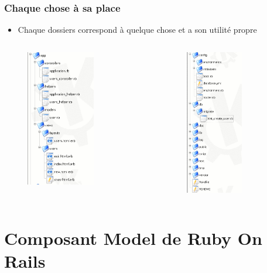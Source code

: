 \documentclass{beamer}
\begin{document}
\begin{frame}
    \frametitle{Chaque chose à sa place}
    \begin{itemize}
        \item Chaque dossiers correspond à quelque chose et a son utilité
            propre
    \end{itemize}
    \begin{columns}
        \begin{column}[l]{4cm}
            \begin{figure}
                \includegraphics[width=30mm]{FS_1.png}
            \end{figure}
        \end{column}
        \begin{column}[r]{4cm}
            \begin{figure}
                \includegraphics[width=25mm]{FS_2.png}
            \end{figure}
        \end{column}
    \end{columns}
\end{frame}

\section{Composant Model de Ruby On Rails}
\end{document}
